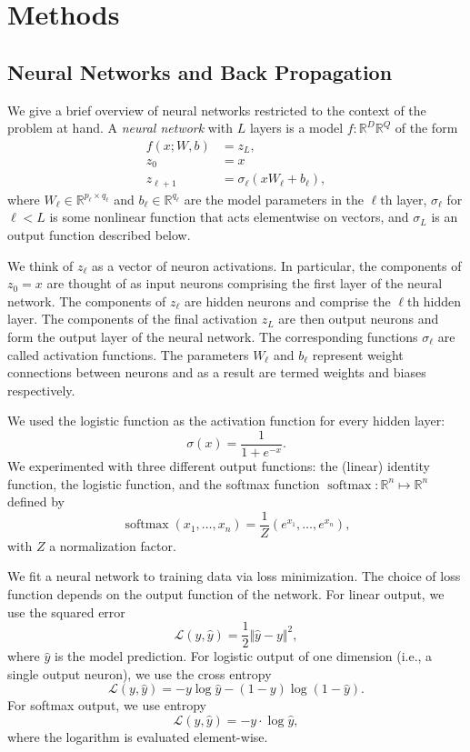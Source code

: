 \documentclass[12pt]{article}
\newcommand{\RR}{\mathbb{R}}
\newcommand{\softmax}{\operatorname{softmax}}
\newcommand{\calL}{\mathcal{L}}
\begin{document}
\section{Methods}

\subsection{Neural Networks and Back Propagation}

We give a brief overview of neural networks restricted to the context of the problem at hand. A \emph{neural network} with $L$ layers is a model $f:\RR^D\RR^Q$ of the form
\begin{align*}
f(x; W,b) &= z_L, \\
z_0 &= x \\
z_{\ell+1} &= \sigma_{\ell}(x W_{\ell}+b_{\ell}),
\end{align*}
where $W_{\ell}\in \RR^{p_{\ell}\times q_{\ell}}$ and $b_{\ell}\in\RR^{q_{\ell}}$ are the model parameters in the $\ell$th layer, $\sigma_{\ell}$ for $\ell < L$ is some nonlinear function that acts elementwise on vectors, and $\sigma_L$ is an output function described below.

We think of $z_{\ell}$ as a vector of neuron activations. In particular, the components of $z_0=x$ are thought of as input neurons comprising the first layer of the neural network. The components of $z_{\ell}$ are hidden neurons and comprise the $\ell$th hidden layer. The components of the final activation $z_L$ are then output neurons and form the output layer of the neural network. The corresponding functions $\sigma_{\ell}$ are called activation functions. The parameters $W_{\ell}$ and $b_{\ell}$ represent weight connections between neurons and as a result are termed weights and biases respectively.

We used the logistic function as the activation function for every hidden layer:
\[ \sigma(x) = \frac{1}{1+e^{-x}}. \]
We experimented with three different output functions: the (linear) identity function, the logistic function, and the softmax function $\softmax:\RR^n\mapsto\RR^n$ defined by
\[ \softmax(x_1,\ldots,x_n) = \frac{1}{Z}(e^{x_1},\ldots,e^{x_n}), \]
with $Z$ a normalization factor.

We fit a neural network to training data via loss minimization. The choice of loss function depends on the output function of the network. For linear output, we use the squared error
\[ \calL(y, \hat{y}) = \frac{1}{2}\Vert \hat{y}-y\Vert^2, \]
where $\hat{y}$ is the model prediction. For logistic output of one dimension (i.e., a single output neuron), we use the cross entropy
\[ \calL(y, \hat{y}) = -y\log\hat{y}-(1-y)\log(1-\hat{y}). \]
For softmax output, we use entropy
\[ \calL(y, \hat{y}) = -y\cdot \log\hat{y}, \]
where the logarithm is evaluated element-wise.
\end{document}
